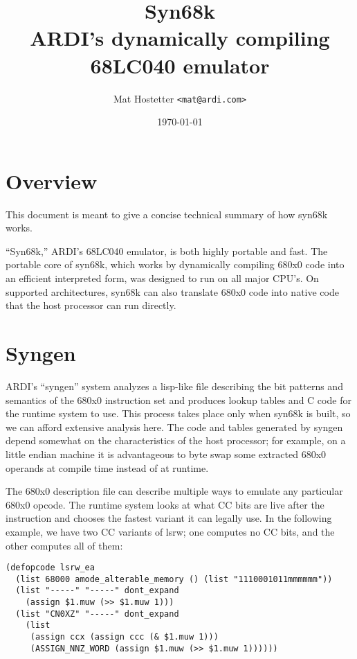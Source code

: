 \title{{\huge{Syn68k}} \\ ARDI's dynamically compiling 68LC040 emulator}
\author{Mat Hostetter {\verb+<mat@ardi.com>+}}
\date{\today}

\maketitle

\section{Overview}

This document is meant to give a concise technical summary of how
syn68k works.

``Syn68k,'' ARDI's 68LC040 emulator, is both highly portable and
fast.  The portable core of syn68k, which works by dynamically
compiling 680x0 code into an efficient interpreted form, was designed
to run on all major CPU's.  On supported architectures, syn68k can
also translate 680x0 code into native code that the host processor
can run directly.

\section{Syngen}

ARDI's ``syngen'' system analyzes a lisp-like file describing the
bit patterns and semantics of the 680x0 instruction set and produces
lookup tables and C code for the runtime system to use.  This
process takes place only when syn68k is built, so we can afford
extensive analysis here.  The code and tables generated by syngen
depend somewhat on the characteristics of the host processor; for
example, on a little endian machine it is advantageous to byte swap
some extracted 680x0 operands at compile time instead of at runtime.

The 680x0 description file can describe multiple ways to emulate
any particular 680x0 opcode.  The runtime system looks at what CC
bits are live after the instruction and chooses the fastest variant
it can legally use.  In the following example, we have two CC
variants of lsrw; one computes no CC bits, and the other computes
all of them:

\begin{verbatim}
(defopcode lsrw_ea
  (list 68000 amode_alterable_memory () (list "1110001011mmmmmm"))
  (list "-----" "-----" dont_expand
	(assign $1.muw (>> $1.muw 1)))
  (list "CN0XZ" "-----" dont_expand
	(list
	 (assign ccx (assign ccc (& $1.muw 1)))
	 (ASSIGN_NNZ_WORD (assign $1.muw (>> $1.muw 1))))))
\end{verbatim}


